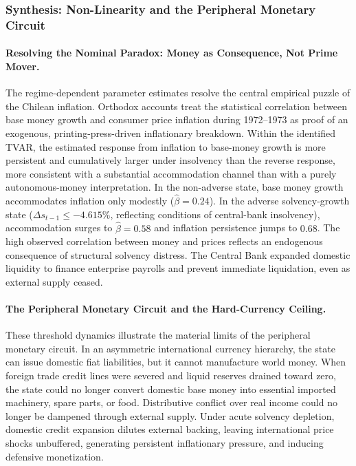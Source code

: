 \subsubsection{Synthesis: Non-Linearity and the Peripheral Monetary Circuit}
\label{sec:tvar_synthesis}

\paragraph{Resolving the Nominal Paradox: Money as Consequence, Not Prime Mover.}
The regime-dependent parameter estimates resolve the central empirical puzzle of the Chilean inflation. Orthodox accounts treat the statistical correlation between base money growth and consumer price inflation during 1972--1973 as proof of an exogenous, printing-press-driven inflationary breakdown. Within the identified TVAR, the estimated response from inflation to base-money growth is more persistent and cumulatively larger under insolvency than the reverse response, more consistent with a substantial accommodation channel than with a purely autonomous-money interpretation. In the non-adverse state, base money growth accommodates inflation only modestly ($\hat{\beta} = 0.24$). In the adverse solvency-growth state ($\Delta s_{t-1} \le -4.615\%$, reflecting conditions of central-bank insolvency), accommodation surges to $\hat{\beta} = 0.58$ and inflation persistence jumps to $0.68$. The high observed correlation between money and prices reflects an endogenous consequence of structural solvency distress. The Central Bank expanded domestic liquidity to finance enterprise payrolls and prevent immediate liquidation, even as external supply ceased.

\paragraph{The Peripheral Monetary Circuit and the Hard-Currency Ceiling.}
These threshold dynamics illustrate the material limits of the peripheral monetary circuit. In an asymmetric international currency hierarchy, the state can issue domestic fiat liabilities, but it cannot manufacture world money. When foreign trade credit lines were severed and liquid reserves drained toward zero, the state could no longer convert domestic base money into essential imported machinery, spare parts, or food. Distributive conflict over real income could no longer be dampened through external supply. Under acute solvency depletion, domestic credit expansion dilutes external backing, leaving international price shocks unbuffered, generating persistent inflationary pressure, and inducing defensive monetization.

